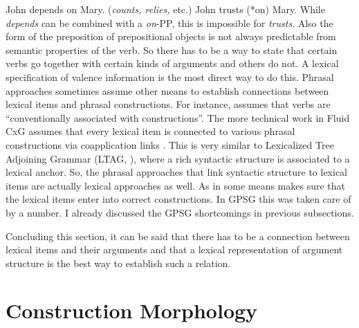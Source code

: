 \documentclass[output=paper]{langsci/langscibook}
\begin{document}
\eal\label{depends-on-ex}
\ex John depends on Mary.  (\emph{counts, relies,} etc.)
\ex John trusts (*on) Mary.  
\zl
While \emph{depends} can be combined with a \emph{on}-PP, this is impossible for \emph{trusts}. Also
the form of the preposition of prepositional objects is not always predictable from semantic
properties of the verb. So there has to be a way to state that certain verbs go together with
certain kinds of arguments and others do not. A lexical specification of valence information is the
most direct way to do this. Phrasal approaches sometimes assume other means to establish connections
between lexical items and phrasal constructions. For instance, \citet[]{Goldberg95a} assumes
that verbs are ``conventionally associated with constructions''. The more technical work in Fluid
CxG assumes that every lexical item is connected to various phrasal constructions via coapplication
links \citep[]{vanTrijp2011a}. This is very similar to Lexicalized Tree Adjoining
Grammar
(LTAG, \citealt*{SAJ88a-u}), where a rich syntactic structure is associated to a lexical anchor. So,
the phrasal approaches that link syntactic structure to lexical items are actually lexical
approaches as well. As in \gpsg some means makes sure that the lexical items enter into correct
constructions. In GPSG this was taken care of by a number. I already discussed the GPSG shortcomings
in previous subsections.

Concluding this section, it can be said that there has to be a connection between lexical items and
their arguments and that a lexical representation of argument structure is the best way to establish
such a relation.


\section{Construction Morphology}
\label{sec-cxg-morphology}
\end{document}
